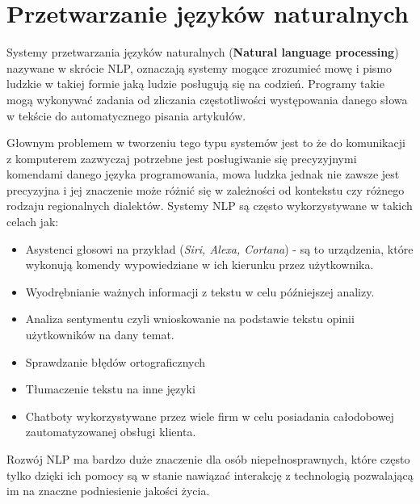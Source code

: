 
\chapter{Przetwarzanie języków naturalnych}
Systemy przetwarzania języków naturalnych (\textbf{Natural language processing}) nazywane 
w skrócie NLP, oznaczają systemy mogące zrozumieć mowę i pismo ludzkie w takiej
formie jaką ludzie posługują się na codzień. Programy takie mogą wykonywać zadania od zliczania
częstotliwości występowania danego słowa w tekście do automatycznego pisania artykułów. 

Głownym problemem w tworzeniu tego typu systemów jest to że do komunikacji z komputerem zazwyczaj
potrzebne jest posługiwanie się precyzyjnymi komendami danego języka programowania, mowa ludzka
jednak nie zawsze jest precyzyjna i jej znaczenie może różnić się w zależności od kontekstu czy
różnego rodzaju regionalnych dialektów. Systemy NLP są często wykorzystywane w takich 
celach jak:
\begin{itemize}
    \item Asystenci głosowi na przykład (\textit{Siri, Alexa, Cortana}) - są to urządzenia, które 
    wykonują komendy wypowiedziane w ich kierunku przez użytkownika.  
    \item Wyodrębnianie ważnych informacji z tekstu w celu późniejszej analizy.
    \item Analiza sentymentu czyli wnioskowanie na podstawie tekstu opinii użytkowników na dany temat.
    \item Sprawdzanie błędów ortograficznych
    \item Tłumaczenie tekstu na inne języki
    \item Chatboty wykorzystywane przez wiele firm w celu posiadania całodobowej zautomatyzowanej obsługi klienta.
\end{itemize}
Rozwój NLP ma bardzo duże znaczenie dla osób niepełnosprawnych, które często tylko dzięki ich pomocy są 
w stanie nawiązać interakcję z technologią pozwalającą im na znaczne podniesienie jakości życia.
